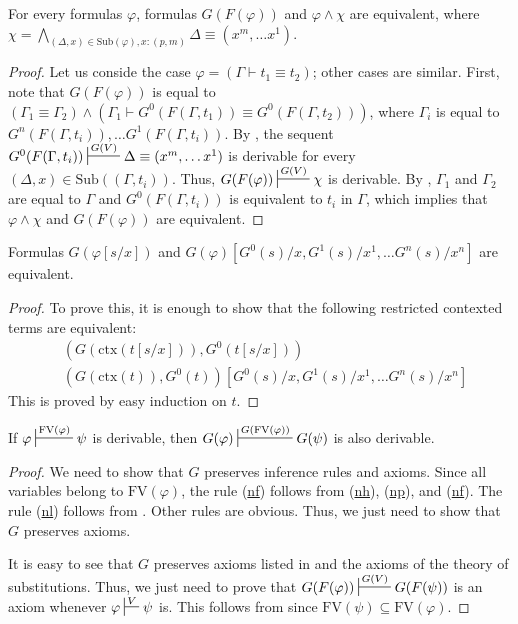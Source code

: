 \documentclass[reqno]{amsart}
\newcommand{\axref}[1]{(\hyperref[ax:#1]{#1})}
\theoremstyle{definition}
\theoremstyle{remark}
\newcommand{\fs}[1]{\mathrm{#1}}
\newcommand{\FV}{\fs{FV}}
\newcommand{\ctx}{\fs{ctx}}
\newcommand{\sub}{\fs{Sub}}
\numberwithin{figure}{section}
\begin{document}
\begin{lem}
For every formulas $\varphi$, formulas $G(F(\varphi))$ and $\varphi \land \chi$ are equivalent,
where $\chi = \bigwedge_{(\Delta,x) \in \sub(\varphi), x : (p,m)} \Delta \equiv (x^m, \ldots x^1)$.
\end{lem}
\begin{proof}
Let us conside the case $\varphi = (\Gamma \vdash t_1 \equiv t_2)$; other cases are similar.
First, note that $G(F(\varphi))$ is equal to $(\Gamma_1 \equiv \Gamma_2) \land (\Gamma_1 \vdash G^0(F(\Gamma,t_1)) \equiv G^0(F(\Gamma,t_2)))$,
where $\Gamma_i$ is equal to $G^n(F(\Gamma,t_i)), \ldots G^1(F(\Gamma,t_i))$.
By , the sequent $G^0(F(\Gamma,t_i)) \sststile{}{G(V)} \Delta \equiv (x^m, \ldots x^1)$ is derivable for every $(\Delta,x) \in \sub((\Gamma,t_i))$.
Thus, $G(F(\varphi)) \sststile{}{G(V)} \chi$ is derivable.
By , $\Gamma_1$ and $\Gamma_2$ are equal to $\Gamma$ and $G^0(F(\Gamma,t_i))$ is equivalent to $t_i$ in $\Gamma$, which implies that $\varphi \land \chi$ and $G(F(\varphi))$ are equivalent.
\end{proof}

\begin{lem}
Formulas $G(\varphi[s/x])$ and $G(\varphi)[G^0(s)/x, G^1(s)/x^1, \ldots G^n(s)/x^n]$ are equivalent.
\end{lem}
\begin{proof}
To prove this, it is enough to show that the following restricted contexted terms are equivalent:
\begin{align*}
& (G(\ctx(t[s/x])), G^0(t[s/x])) \\
& (G(\ctx(t)), G^0(t))[G^0(s)/x, G^1(s)/x^1, \ldots G^n(s)/x^n]
\end{align*}
This is proved by easy induction on $t$.
\end{proof}

\begin{lem}
If $\varphi \sststile{}{\FV(\varphi)} \psi$ is derivable, then $G(\varphi) \sststile{}{G(\FV(\varphi))} G(\psi)$ is also derivable.
\end{lem}
\begin{proof}
We need to show that $G$ preserves inference rules and axioms.
Since all variables belong to $\FV(\varphi)$, the rule \axref{nf} follows from \axref{nh}, \axref{np}, and \axref{nf}.
The rule \axref{nl} follows from .
Other rules are obvious.
Thus, we just need to show that $G$ preserves axioms.

It is easy to see that $G$ preserves axioms listed in  and the axioms of the theory of substitutions.
Thus, we just need to prove that $G(F(\varphi)) \sststile{}{G(V)} G(F(\psi))$ is an axiom whenever $\varphi \sststile{}{V} \psi$ is.
This follows from  since $\FV(\psi) \subseteq \FV(\varphi)$.
\end{proof}
\end{document}
